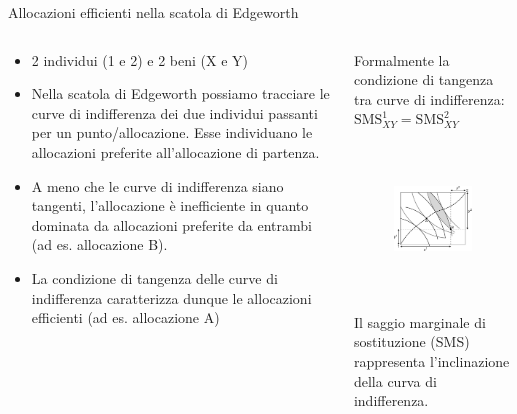 \documentclass[aspectratio=64,11pt]{beamer}
\begin{document}
\begin{frame}{Allocazioni efficienti nella scatola di Edgeworth}
\begin{columns}
\begin{column}{.5\columnwidth}
\fontsize{11}{11}\selectfont
\begin{itemize}
\item 2 individui (1 e 2) e 2 beni (X e Y)
\item Nella scatola di Edgeworth possiamo tracciare le curve di indifferenza dei due individui passanti per un punto/allocazione. Esse individuano le allocazioni preferite all’allocazione di partenza.
\item A meno che le curve di indifferenza siano tangenti, l’allocazione è inefficiente in quanto dominata da allocazioni preferite da entrambi (ad es. allocazione B).
\item La condizione di tangenza delle curve di indifferenza caratterizza dunque le allocazioni efficienti (ad es. allocazione A)
\end{itemize}
\end{column}
\begin{column}{.5\columnwidth}
\footnotesize
Formalmente la condizione di tangenza
tra curve di indifferenza: $\text{SMS}^1_{XY}=\text{SMS}^2_{XY}$

\begin{figure}
\centering
\includegraphics[height=4cm]{./figure/edgeworth-1.pdf}
\end{figure}

Il saggio marginale di sostituzione (SMS) rappresenta l’inclinazione della curva di indifferenza. 
\end{column}
\end{columns}
\end{frame}
\end{document}
